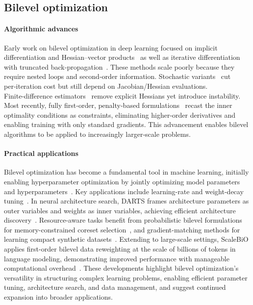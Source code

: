 \subsection{Bilevel optimization}
\paragraph{Algorithmic advances}
Early work on bilevel optimization in deep learning focused on implicit differentiation and Hessian–vector products~\citep{bi_domke2012generic,bi_grazzi2020iteration,bi_pedregosa2016hyperparameter} as well as iterative differentiation with truncated back‑propagation~\citep{bi_maclaurin2015gradient,bi_shaban2019truncated, bi_zhou2022model}. These methods scale poorly because they require nested loops and second‑order information.  Stochastic variants~\citep{bi_Chen2021ASM,bi_Ghadimi2018ApproximationMF,bi_Hong2020ATF,bi_Ji2020BilevelOC,bi_Khanduri2021ANA} cut per‑iteration cost but still depend on Jacobian/Hessian evaluations.  Finite‑difference estimators~\citep{bi_Sow2021OnTC,bi_Yang2023AchievingOC} remove explicit Hessians yet introduce instability.  Most recently, fully first‑order, penalty‑based formulations~\citep{bi_Chen2023NearOptimalNB,kwon2023fully,bi_Ye2022BOMEBO} recast the inner optimality conditions as constraints, eliminating higher‑order derivatives and enabling training with only standard gradients. This advancement enables bilevel algorithms to be applied to increasingly larger‑scale problems.   

\paragraph{Practical applications}  
Bilevel optimization has become a fundamental tool in machine learning, initially enabling hyperparameter optimization by jointly optimizing model parameters and hyperparameters~\citep{bi_app_Franceschi2018BilevelPF}. Key applications include learning-rate and weight-decay tuning~\citep{bi_franceschi2017forward,bi_lorraine2020optimizing}. In neural architecture search, DARTS frames architecture parameters as outer variables and weights as inner variables, achieving efficient architecture discovery~\citep{bi_app_Liu2018DARTSDA}. Resource-aware tasks benefit from probabilistic bilevel formulations for memory-constrained coreset selection~\citep{ds_bi_zhou2022probabilistic}, and gradient-matching methods for learning compact synthetic datasets~\citep{ds_distill_wang2018dataset}. Extending to large-scale settings, ScaleBiO applies first-order bilevel data reweighting at the scale of billions of tokens in language modeling, demonstrating improved performance with manageable computational overhead~\citep{pan2024scalebio}. These developments highlight bilevel optimization’s versatility in structuring complex learning problems, enabling efficient parameter tuning, architecture search, and data management, and suggest continued expansion into broader applications.   

